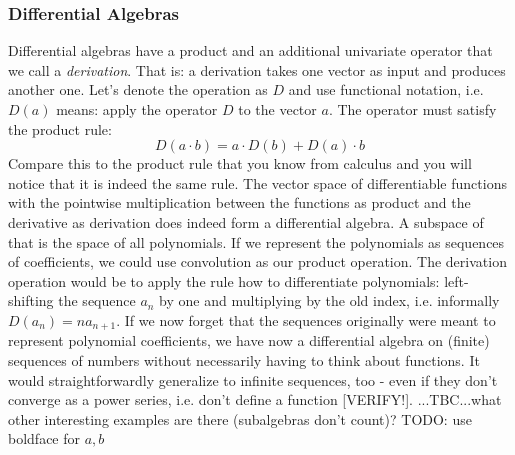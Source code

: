 \subsubsection{Differential Algebras} 
Differential algebras have a product and an additional univariate operator that we call a \emph{derivation}. That is: a derivation takes one vector as input and produces another one. Let's denote the operation as $D$ and use functional notation, i.e. $D(a)$ means: apply the operator $D$ to the vector $a$. The operator must satisfy the product rule:
\begin{equation}
 D(a \cdot b) = a \cdot D(b) + D(a) \cdot b
\end{equation}
Compare this to the product rule that you know from calculus and you will notice that it is indeed the same rule. The vector space of differentiable functions with the pointwise multiplication between the functions as product and the derivative as derivation does indeed form a differential algebra. A subspace of that is the space of all polynomials. If we represent the polynomials as sequences of coefficients, we could use convolution as our product operation. The derivation operation would be to apply the rule how to differentiate polynomials: left-shifting the sequence $a_n$ by one and multiplying by the old index, i.e. informally $D(a_n) = n a_{n+1}$. If we now forget that the sequences originally were meant to represent polynomial coefficients, we have now a differential algebra on (finite) sequences of numbers without necessarily having to think about functions. It would straightforwardly generalize to infinite sequences, too - even if they don't converge as a power series, i.e. don't define a function [VERIFY!]. ...TBC...what other interesting examples are there (subalgebras don't count)? TODO: use boldface for $a,b$





